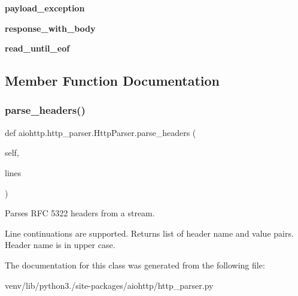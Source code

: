 \begin{DoxyCompactItemize}
\mbox{\label{classaiohttp_1_1http__parser_1_1_http_parser_a422dfce412368829e7f64c449b4c5a0b}} 
{\bfseries payload\+\_\+exception}
\item 
\mbox{\label{classaiohttp_1_1http__parser_1_1_http_parser_a706f6035c972843641e05969f364b9f9}} 
{\bfseries response\+\_\+with\+\_\+body}
\item 
\mbox{\label{classaiohttp_1_1http__parser_1_1_http_parser_a991efaacf245c0c782d486085b1ef603}} 
{\bfseries read\+\_\+until\+\_\+eof}
\end{DoxyCompactItemize}


\subsection{Member Function Documentation}
\mbox{\label{classaiohttp_1_1http__parser_1_1_http_parser_a290b57971f5601f24455642f72c28551}} 
\subsubsection{\texorpdfstring{parse\+\_\+headers()}{parse\_headers()}}
{\footnotesize\ttfamily def aiohttp.\+http\+\_\+parser.\+Http\+Parser.\+parse\+\_\+headers (\begin{DoxyParamCaption}\item[{}]{self,  }\item[{}]{lines }\end{DoxyParamCaption})}

\begin{DoxyVerb}Parses RFC 5322 headers from a stream.

Line continuations are supported. Returns list of header name
and value pairs. Header name is in upper case.
\end{DoxyVerb}
 

The documentation for this class was generated from the following file\+:\begin{DoxyCompactItemize}
\item 
venv/lib/python3./site-\/packages/aiohttp/http\+\_\+parser.\+py\end{DoxyCompactItemize}
